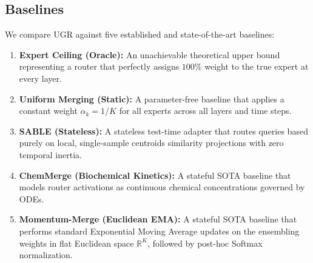 \subsection{Baselines}
We compare UGR against five established and state-of-the-art baselines:
\begin{enumerate}
    \item \textbf{Expert Ceiling (Oracle):} An unachievable theoretical upper bound representing a router that perfectly assigns $100\%$ weight to the true expert at every layer.
    \item \textbf{Uniform Merging (Static):} A parameter-free baseline that applies a constant weight $\alpha_k = 1/K$ for all experts across all layers and time steps.
    \item \textbf{SABLE (Stateless):} A stateless test-time adapter \cite{wang2020tent} that routes queries based purely on local, single-sample centroids similarity projections with zero temporal inertia.
    \item \textbf{ChemMerge (Biochemical Kinetics):} A stateful SOTA baseline that models router activations as continuous chemical concentrations governed by ODEs.
    \item \textbf{Momentum-Merge (Euclidean EMA):} A stateful SOTA baseline that performs standard Exponential Moving Average updates on the ensembling weights in flat Euclidean space $\mathbb{R}^K$, followed by post-hoc Softmax normalization.
\end{enumerate}

